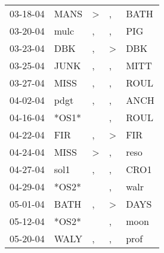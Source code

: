 \begin{supertabular}{p{0.07\textwidth}p{0.06\textwidth}p{0.02\textwidth}p{0.02\textwidth}p{0.06\textwidth}}
          03-18-04\textsuperscript{} &           MANS\textsuperscript{} &     \textgreater &                , &           BATH\textsuperscript{} \\
          03-20-04\textsuperscript{} &           mulc\textsuperscript{} &                , &                , &            PIG\textsuperscript{} \\
          03-23-04\textsuperscript{} &            DBK\textsuperscript{} &                , &     \textgreater &            DBK\textsuperscript{} \\
          03-25-04\textsuperscript{} &           JUNK\textsuperscript{} &                , &                , &           MITT\textsuperscript{} \\
          03-27-04\textsuperscript{} &           MISS\textsuperscript{} &                , &                , &           ROUL\textsuperscript{} \\
          04-02-04\textsuperscript{} &           pdgt\textsuperscript{} &                , &                , &           ANCH\textsuperscript{} \\
          04-16-04\textsuperscript{} &                            *OS1* &                  &                , &           ROUL\textsuperscript{} \\
          04-22-04\textsuperscript{} &            FIR\textsuperscript{} &                , &     \textgreater &            FIR\textsuperscript{} \\
          04-24-04\textsuperscript{} &           MISS\textsuperscript{} &     \textgreater &                , &           reso\textsuperscript{} \\
          04-27-04\textsuperscript{} &           sol1\textsuperscript{} &                , &                , &           CRO1\textsuperscript{} \\
          04-29-04\textsuperscript{} &                            *OS2* &                  &                , &           walr\textsuperscript{} \\
          05-01-04\textsuperscript{} &           BATH\textsuperscript{} &                , &     \textgreater &           DAYS\textsuperscript{} \\
          05-12-04\textsuperscript{} &                            *OS2* &                  &                , &           moon\textsuperscript{} \\
          05-20-04\textsuperscript{} &           WALY\textsuperscript{} &                , &                , &           prof\textsuperscript{} \\

\end{supertabular}
